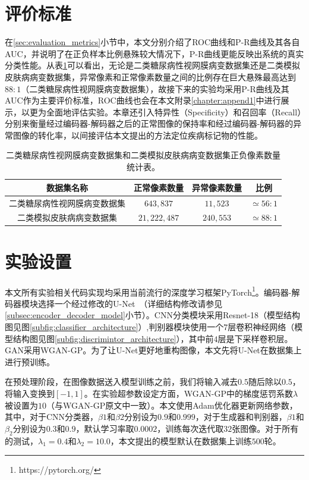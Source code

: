 \section{评价标准}\label{sec:exper_evaluation_metrics}
在\ref{sec:evaluation_metrics}小节中，本文分别介绍了ROC曲线和P-R曲线及其各自AUC，并说明了在正负样本比例悬殊较大情况下，P-R曲线更能反映出系统的真实分类性能。从表\ref{tab:bin_ds_pixel_freqs}可以看出，无论是二类糖尿病性视网膜病变数据集还是二类模拟皮肤病病变数据集，异常像素和正常像素数量之间的比例存在巨大悬殊最高达到$88:1$（二类糖尿病性视网膜病变数据集），故接下来的实验均采用P-R曲线及其AUC作为主要评价标准，ROC曲线也会在本文附录\ref{chapter:append1}中进行展示，以更为全面地评估实验。本章还引入特异性（Specificity）和召回率（Recall）分别来衡量经过编码器-解码器之后的正常图像的保持率和经过编码器-解码器的异常图像的转化率，以间接评估本文提出的方法定位疾病标记物的性能。
\begin{table}[h]
	\centering
	\caption[本章实验数据集正负像素数量统计表]{二类糖尿病性视网膜病变数据集和二类模拟皮肤病病变数据集正负像素数量统计表。}
	\label{tab:bin_ds_pixel_freqs}
	\begin{tabular}{c|c|c|c}
		\toprule[2pt]
		数据集名称 & 正常像素数量 & 异常像素数量 & 比例 \\
		\midrule[2pt]
		二类糖尿病性视网膜病变数据集&  $643,837$ & $11,523$ & $\simeq 56: 1$ \\ \hline
		二类模拟皮肤病病变数据集 & $21,222,487$ & $240,553$ & $\simeq 88: 1$ \\
		\bottomrule[2pt]
	\end{tabular}
\end{table}
\section{实验设置}\label{sec:exper_setting}
本文所有实验相关代码实现均采用当前流行的深度学习框架PyTorch\footnote{https://pytorch.org/}。编码器-解码器模块选择一个经过修改的U-Net~\cite{iglovikov2018ternausnet}（详细结构修改请参见\ref{subsec:encoder_decoder_model}小节）。CNN分类模块采用Resnet-18（模型结构图见图\ref{subfig:classifier_architecture}）,判别器模块使用一个$7$层卷积神经网络（模型结构图见图\ref{subfig:discrimintor_architecture}），其中前$4$层是下采样卷积层。GAN采用WGAN-GP。为了让U-Net更好地重构图像，本文先将U-Net在数据集上进行预训练。

在预处理阶段，在图像数据送入模型训练之前，我们将输入减去$0.5$随后除以$0.5$，将输入变换到$[-1,1]$。在实验超参数设定方面，WGAN-GP中的梯度惩罚系数$\lambda$被设置为$10$（与WGAN-GP原文中一致）。本文使用Adam优化器更新网络参数，其中，对于CNN分类器，$\beta1$和$\beta2$分别设为$0.9$和$0.999$，对于生成器和判别器，$\beta1$和$\beta_2$分别设为$0.3$和$0.9$，默认学习率取$0.0002$，训练每次迭代取$32$张图像。对于所有的测试，$\lambda_1 = 0.4$和$\lambda_{2} = 10.0$，本文提出的模型默认在数据集上训练$500$轮。

